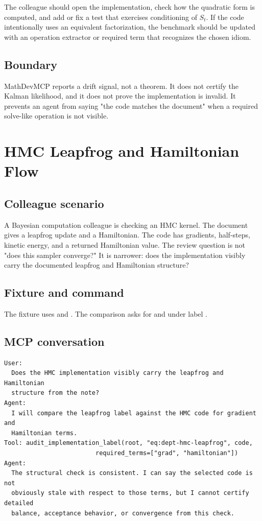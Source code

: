 \documentclass[12pt,a4paper,openany]{book}
\begin{document}
The colleague should open the implementation, check how the quadratic form is
computed, and add or fix a test that exercises conditioning of \(S_t\). If the
code intentionally uses an equivalent factorization, the benchmark should be
updated with an operation extractor or required term that recognizes the chosen
idiom.

\section*{Boundary}

MathDevMCP reports a drift signal, not a theorem. It does not certify the
Kalman likelihood, and it does not prove the implementation is invalid. It
prevents an agent from saying "the code matches the document" when a required
solve-like operation is not visible.

\chapter{HMC Leapfrog and Hamiltonian Flow}

\section*{Colleague scenario}

A Bayesian computation colleague is checking an HMC kernel. The document gives a
leapfrog update and a Hamiltonian. The code has gradients, half-steps, kinetic
energy, and a returned Hamiltonian value. The review question is not "does this
sampler converge?" It is narrower: does the implementation visibly carry the
documented leapfrog and Hamiltonian structure?

\section*{Fixture and command}

The fixture uses  and
. The comparison asks for 
and  under label .

\section*{MCP conversation}

\begin{lstlisting}[basicstyle=\ttfamily\scriptsize]
User:
  Does the HMC implementation visibly carry the leapfrog and Hamiltonian
  structure from the note?
Agent:
  I will compare the leapfrog label against the HMC code for gradient and
  Hamiltonian terms.
Tool: audit_implementation_label(root, "eq:dept-hmc-leapfrog", code,
                         required_terms=["grad", "hamiltonian"])
Agent:
  The structural check is consistent. I can say the selected code is not
  obviously stale with respect to those terms, but I cannot certify detailed
  balance, acceptance behavior, or convergence from this check.
\end{lstlisting}
\end{document}
